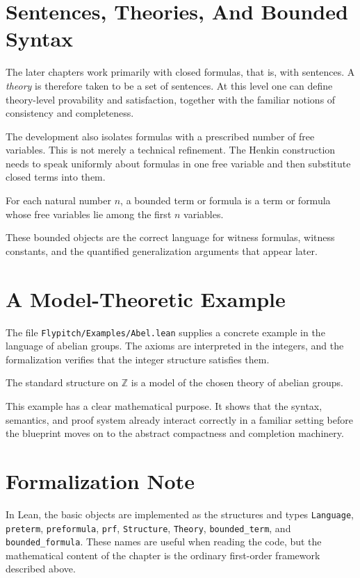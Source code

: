 \section{Sentences, Theories, And Bounded Syntax}

The later chapters work primarily with closed formulas, that is, with
sentences. A \emph{theory} is therefore taken to be a set of sentences. At this
level one can define theory-level provability and satisfaction, together with
the familiar notions of consistency and completeness.

The development also isolates formulas with a prescribed number of free
variables. This is not merely a technical refinement. The Henkin construction
needs to speak uniformly about formulas in one free variable and then
substitute closed terms into them.

\begin{definition}
\label{def:fol-bounded-syntax}
For each natural number $n$, a bounded term or formula is a term or formula
whose free variables lie among the first $n$ variables.
\end{definition}

These bounded objects are the correct language for witness formulas, witness
constants, and the quantified generalization arguments that appear later.

\section{A Model-Theoretic Example}

The file \texttt{Flypitch/Examples/Abel.lean} supplies a concrete example in the
language of abelian groups. The axioms are interpreted in the integers, and the
formalization verifies that the integer structure satisfies them.

\begin{proposition}
\label{prop:abelian-example}
The standard structure on $\mathbb{Z}$ is a model of the chosen theory of
abelian groups.
\end{proposition}

This example has a clear mathematical purpose. It shows that the syntax,
semantics, and proof system already interact correctly in a familiar setting
before the blueprint moves on to the abstract compactness and completion
machinery.

\section{Formalization Note}

In Lean, the basic objects are implemented as the structures and types
\texttt{Language}, \texttt{preterm}, \texttt{preformula}, \texttt{prf},
\texttt{Structure}, \texttt{Theory}, \texttt{bounded\_term}, and
\texttt{bounded\_formula}. These names are useful when reading the code, but
the mathematical content of the chapter is the ordinary first-order framework
described above.
